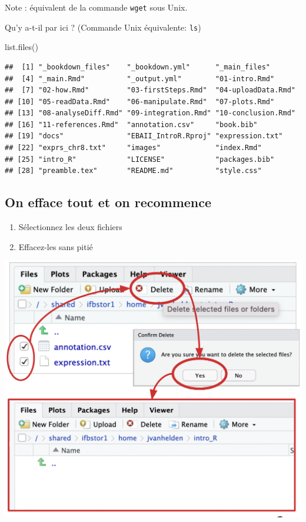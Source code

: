 \documentclass[
]{book}
\newenvironment{Shaded}{\begin{snugshade}}{\end{snugshade}}
\newcommand{\FunctionTok}[1]{\textcolor[rgb]{0.00,0.00,0.00}{#1}}
\newcommand{\NormalTok}[1]{#1}
\providecommand{\tightlist}{%
  \setlength{\itemsep}{0pt}\setlength{\parskip}{0pt}}
\begin{document}
Note : équivalent de la commande \texttt{wget} sous Unix.

Qu'y a-t-il par ici ? (Commande Unix équivalente: \texttt{ls})

\begin{Shaded}
\begin{Highlighting}[]
\FunctionTok{list.files}\NormalTok{()}
\end{Highlighting}
\end{Shaded}

\begin{verbatim}
##  [1] "_bookdown_files"    "_bookdown.yml"      "_main_files"       
##  [4] "_main.Rmd"          "_output.yml"        "01-intro.Rmd"      
##  [7] "02-how.Rmd"         "03-firstSteps.Rmd"  "04-uploadData.Rmd" 
## [10] "05-readData.Rmd"    "06-manipulate.Rmd"  "07-plots.Rmd"      
## [13] "08-analyseDiff.Rmd" "09-integration.Rmd" "10-conclusion.Rmd" 
## [16] "11-references.Rmd"  "annotation.csv"     "book.bib"          
## [19] "docs"               "EBAII_IntroR.Rproj" "expression.txt"    
## [22] "exprs_chr8.txt"     "images"             "index.Rmd"         
## [25] "intro_R"            "LICENSE"            "packages.bib"      
## [28] "preamble.tex"       "README.md"          "style.css"
\end{verbatim}

\hypertarget{on-efface-tout-et-on-recommence-1}{%
\subsection{On efface tout et on recommence}\label{on-efface-tout-et-on-recommence-1}}

\begin{enumerate}
\def\labelenumi{\arabic{enumi}.}
\tightlist
\item
  Sélectionnez les deux fichiers
\item
  Effacez-les sans pitié
\end{enumerate}

\includegraphics{images/delete.png}
\end{document}
